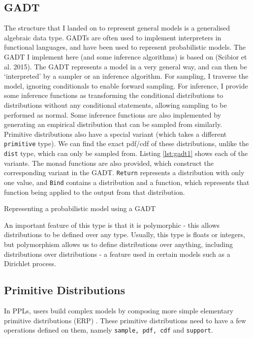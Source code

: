 \subsection{GADT} \label{sec:gadt}
The structure that I landed on to represent general models is a generalised algebraic data type. GADTs are often used to implement interpreters in functional languages, and have been used to represent probabilistic models. The GADT I implement here (and some inference algorithms) is based on (Scibior et al. 2015)\cite{scibior2015practical}. The GADT represents a model in a very general way, and can then be `interpreted' by a sampler or an inference algorithm. For sampling, I traverse the model, ignoring conditionals to enable forward sampling. For inference, I provide some inference functions as transforming the conditional distributions to distributions without any conditional statements, allowing sampling to be performed as normal. Some inference functions are also implemented by generating an empirical distribution that can be sampled from similarly. Primitive distributions also have a special variant (which takes a different \texttt{primitive} type). We can find the exact pdf/cdf of these distributions, unlike the \texttt{dist} type, which can only be sampled from. Listing \ref{lst:gadt1} shows each of the variants. The monad functions are also provided, which construct the corresponding variant in the GADT. \texttt{Return} represents a distribution with only one value, and \texttt{Bind} contains a distribution and a function, which represents that function being applied to the output from that distribution.

\begin{listing}[!ht]
	\caption{Representing a probabilistic model using a GADT}
	\label{lst:gadt1}
\end{listing}

An important feature of this type is that it is polymorphic - this allows distributions to be defined over any type. Usually, this type is floats or integers, but polymorphism allows us to define distributions over anything, including distributions over distributions - a feature used in certain models such as a Dirichlet process.

\subsection{Primitive Distributions}
In PPLs, users build complex models by composing more simple elementary primitive distributions (ERP) \cite{pmlr-v15-wingate11a}. These primitive distributions need to have a few operations defined on them, namely \texttt{sample, pdf, cdf} and \texttt{support}.

